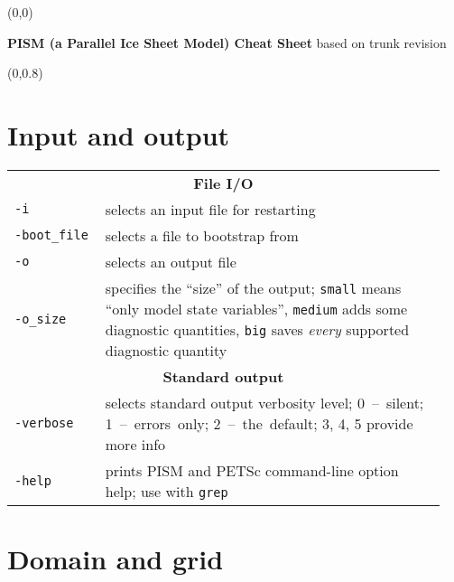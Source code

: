 \documentclass[landscape]{article}
\newcommand{\PISMREV}{trunk revision }
\newcommand{\tabletitle}[1]{\multicolumn{2}{c}{\textbf{#1}}}
\begin{document}
\pagestyle{empty}

\begin{textblock}{47}(0,0)
  \begin{center}
    \Large{\textbf{PISM (a Parallel Ice Sheet Model) Cheat Sheet} based on \PISMREV}
  \end{center}
\end{textblock}

\begin{textblock}{15}(0,0.8)
\section{Input and output}
\label{sec:input-output}

\begin{tabular}{@{}p{0.2\linewidth}p{0.75\linewidth}@{}}
\tabletitle{File I/O} \\
\texttt{-i} & selects an input file for restarting \\
\texttt{-boot_file} & selects a file to bootstrap from \\
\texttt{-o} & selects an output file \\
\texttt{-o_size} & specifies the ``size'' of the output; \texttt{small} means
``only model state variables'', \texttt{medium} adds some
diagnostic quantities, \texttt{big} saves \emph{every} supported diagnostic quantity\\
\tabletitle{Standard output} \\
\texttt{-verbose} & selects standard output verbosity level; \mbox{0 -- silent}; \mbox{1 --
errors only}; \mbox{2 -- the default}; 3, 4, 5 provide more info\\
\texttt{-help} & prints PISM and PETSc command-line option help; use with \texttt{grep}\\
\end{tabular}

\section{Domain and grid}
\label{sec:grid-setup}
  

\end{textblock}
\end{document}
